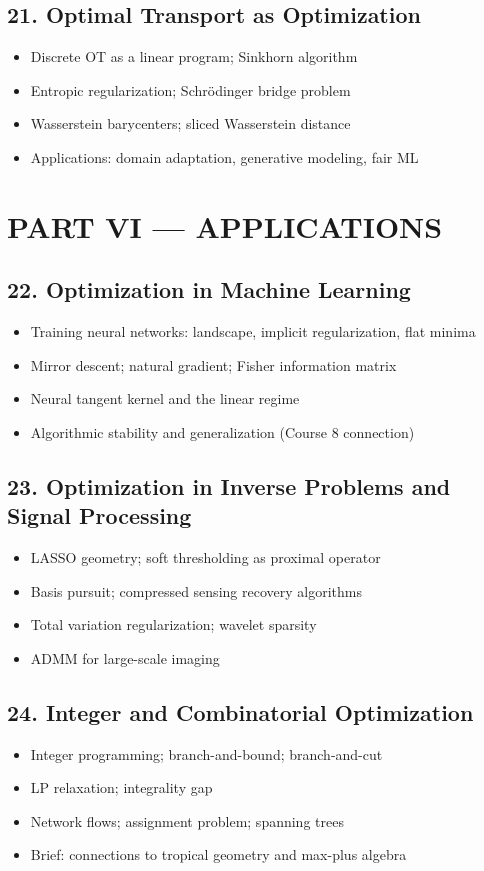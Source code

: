 \subsection{21. Optimal Transport as Optimization}
\begin{itemize}
\item Discrete OT as a linear program; Sinkhorn algorithm
\item Entropic regularization; Schr\"odinger bridge problem
\item Wasserstein barycenters; sliced Wasserstein distance
\item Applications: domain adaptation, generative modeling, fair ML
\end{itemize}

\section{PART VI --- APPLICATIONS}

\subsection{22. Optimization in Machine Learning}
\begin{itemize}
\item Training neural networks: landscape, implicit regularization, flat minima
\item Mirror descent; natural gradient; Fisher information matrix
\item Neural tangent kernel and the linear regime
\item Algorithmic stability and generalization (Course 8 connection)
\end{itemize}

\subsection{23. Optimization in Inverse Problems and Signal Processing}
\begin{itemize}
\item LASSO geometry; soft thresholding as proximal operator
\item Basis pursuit; compressed sensing recovery algorithms
\item Total variation regularization; wavelet sparsity
\item ADMM for large-scale imaging
\end{itemize}

\subsection{24. Integer and Combinatorial Optimization}
\begin{itemize}
\item Integer programming; branch-and-bound; branch-and-cut
\item LP relaxation; integrality gap
\item Network flows; assignment problem; spanning trees
\item Brief: connections to tropical geometry and max-plus algebra
\end{itemize}

